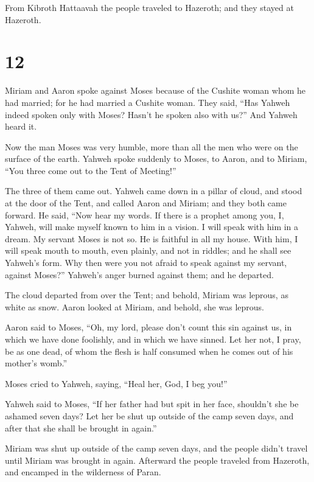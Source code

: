  From Kibroth Hattaavah the people traveled to Hazeroth;
and they stayed at Hazeroth.

\hypertarget{section-11}{%
\section{12}\label{section-11}}

 Miriam and Aaron spoke against Moses because of the
Cushite woman whom he had married; for he had married a Cushite woman.
 They said, ``Has Yahweh indeed spoken only with Moses?
Hasn't he spoken also with us?'' And Yahweh heard it.

 Now the man Moses was very humble, more than all the men
who were on the surface of the earth.  Yahweh spoke
suddenly to Moses, to Aaron, and to Miriam, ``You three come out to the
Tent of Meeting!''

The three of them came out.  Yahweh came down in a pillar
of cloud, and stood at the door of the Tent, and called Aaron and
Miriam; and they both came forward.  He said, ``Now hear
my words. If there is a prophet among you, I, Yahweh, will make myself
known to him in a vision. I will speak with him in a dream.
 My servant Moses is not so. He is faithful in all my
house.  With him, I will speak mouth to mouth, even
plainly, and not in riddles; and he shall see Yahweh's form. Why then
were you not afraid to speak against my servant, against Moses?''
 Yahweh's anger burned against them; and he departed.

 The cloud departed from over the Tent; and behold,
Miriam was leprous, as white as snow. Aaron looked at Miriam, and
behold, she was leprous.

 Aaron said to Moses, ``Oh, my lord, please don't count
this sin against us, in which we have done foolishly, and in which we
have sinned.  Let her not, I pray, be as one dead, of
whom the flesh is half consumed when he comes out of his mother's
womb.''

 Moses cried to Yahweh, saying, ``Heal her, God, I beg
you!''

 Yahweh said to Moses, ``If her father had but spit in
her face, shouldn't she be ashamed seven days? Let her be shut up
outside of the camp seven days, and after that she shall be brought in
again.''

 Miriam was shut up outside of the camp seven days, and
the people didn't travel until Miriam was brought in again.
 Afterward the people traveled from Hazeroth, and
encamped in the wilderness of Paran.

